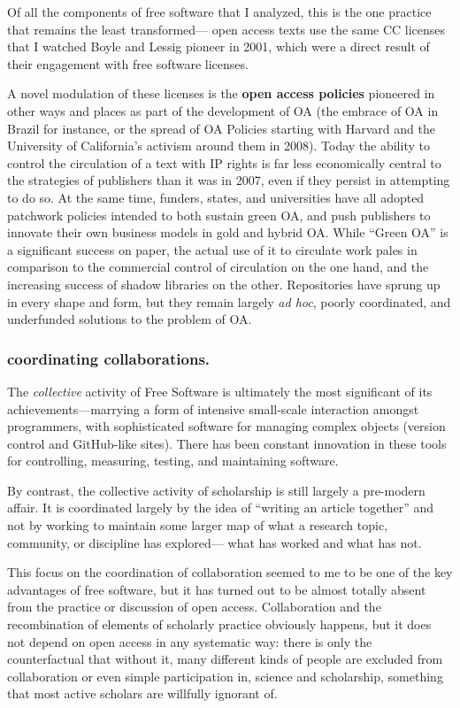 \documentclass[11pt]{article}
\begin{document}
Of all the components of free software that I analyzed, this is the one practice that remains the least transformed--- open access texts use the same CC licenses that I watched  Boyle and Lessig pioneer in 2001, which were a direct result of their engagement with free software licenses.

A novel modulation of these licenses is the \textbf{open access policies} pioneered in other ways and places as part of the development of OA (the embrace of OA in Brazil for instance, or the spread of OA Policies starting with Harvard and the University of California's activism around them in 2008).  Today the ability to control the circulation of a text with IP rights is far less economically central to the strategies of publishers than it was in 2007, even if they persist in attempting to do so.  At the same time, funders, states, and universities have all adopted patchwork policies intended to both sustain green OA, and push publishers to innovate their own business models in gold and hybrid OA.  While ``Green OA'' is a significant success on paper, the actual use of it to circulate work pales in comparison to the commercial control of circulation on the one hand, and the increasing success of shadow libraries on the other. Repositories have sprung up in every shape and form, but they remain largely \emph{ad hoc}, poorly coordinated, and underfunded solutions to the problem of OA.

\subsubsection*{\textbf{coordinating collaborations}.}
\label{sec:org77f30e9}

The \emph{collective} activity of Free Software is ultimately the most significant of its achievements---marrying a form of intensive small-scale interaction amongst programmers, with sophisticated software for managing complex objects (version control and GitHub-like sites).  There has been constant innovation in these tools for controlling, measuring, testing, and maintaining software.

By contrast, the collective activity of scholarship is still largely a pre-modern affair.  It is coordinated largely by the idea of ``writing an article together'' and not by working to maintain some larger map of what a research topic, community, or discipline has explored--- what has worked and what has not. 

This focus on the coordination of collaboration seemed to me to be one of the key advantages of free software, but it has turned out to be almost totally absent from the practice or discussion of open access.  Collaboration and the recombination of elements of scholarly practice obviously happens, but it does not depend on open access in any systematic way: there is only the counterfactual that without it, many different kinds of people are excluded from collaboration or even simple participation in, science and scholarship, something that most active scholars are willfully ignorant of.
\end{document}
